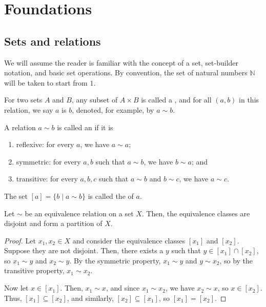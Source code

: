 \chapter{Foundations}

\section{Sets and relations}

We will assume the reader is familiar with the concept of a set, set-builder notation, and basic set operations. By convention, the set of natural numbers $ \mathbb{N} $ will be taken to start from $ 1 $.

\begin{defn}
For two sets $ A $ and $ B $, any subset of $ A\times B $ is called a , and for all $ (a,b) $ in this relation, we say $ a $ is  $ b $, denoted, for example, by $ a\sim b $.
\end{defn}

\begin{defn}\label{defn:equiv_relation}
A relation $ a\sim b $ is called an  if it is
\begin{enumerate}
    \item reflexive: for every $ a $, we have $ a\sim a $;
    \item symmetric: for every $ a,b $ such that $ a\sim b $, we have $ b\sim a $; and
    \item transitive: for every $ a,b,c $ such that $ a\sim b $ and $ b\sim c $, we have $ a\sim c $.
\end{enumerate}
\end{defn}

\begin{defn}
The set $ [a]=\{b\mid a\sim b\} $ is called the  of $ a $.
\end{defn}

\begin{thm}
Let $ \sim $ be an equivalence relation on a set $ X $. Then, the equivalence classes are disjoint and form a partition of $ X $.
\end{thm}
\begin{proof}
Let $ x_1,x_2\in X $ and consider the equivalence classes $ [x_1] $ and $ [x_2] $. Suppose they are not disjoint. Then, there exists a $ y $ such that $ y\in[x_1]\cap[x_2] $, so $ x_1\sim y $ and $ x_2\sim y $. By the symmetric property, $ x_1\sim y $ and $ y\sim x_2 $, so by the transitive property, $ x_1\sim x_2 $.

Now let $ x\in[x_1] $. Then, $ x_1\sim x $, and since $ x_1\sim x_2 $, we have $ x_2\sim x $, so $ x\in[x_2] $. Thus, $ [x_1]\subseteq[x_2] $, and similarly, $ [x_2]\subseteq[x_1] $, so $ [x_1]=[x_2] $.
\end{proof}

